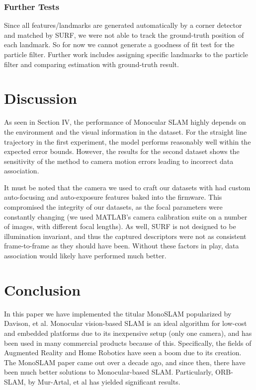 \documentclass[conference]{IEEEtran}
\begin{document}
\subsubsection{Further Tests}
Since all features/landmarks are generated automatically by a corner detector and matched by SURF, we were not able to track the ground-truth position of each landmark. So for now we cannot generate a goodness of fit test for the particle filter. Further work includes assigning specific landmarks to the particle filter and comparing estimation with ground-truth result.


\section{Discussion}
As seen in Section IV, the performance of Monocular SLAM highly depends on the environment and the visual information in the dataset. For the straight line trajectory in the first experiment, the model performs reasonably well within the expected error bounds. However, the results for the second dataset shows the sensitivity of the method to camera motion errors leading to incorrect data association. 

It must be noted that the camera we used to craft our datasets with had custom auto-focusing and auto-exposure features baked into the firmware. This compromised the integrity of our datasets, as the focal parameters were constantly changing (we used MATLAB's camera calibration suite on a number of images, with different focal lengths). As well, SURF is not designed to be illumination invariant, and thus the captured descriptors were not as consistent frame-to-frame as they should have been. Without these factors in play, data association would likely have performed much better.



\section{Conclusion}

In this paper we have implemented the titular MonoSLAM popularized by Davison, et al. Monocular vision-based SLAM is an ideal algorithm for low-cost and embedded platforms due to its inexpensive setup (only one camera), and has been used in many commercial products because of this. Specifically, the fields of Augmented Reality and Home Robotics have seen a boom due to its creation. The MonoSLAM paper came out over a decade ago, and since then, there have been much better solutions to Monocular-based SLAM. Particularly, ORB-SLAM, by Mur-Artal, et al \cite{mur2015orb} has yielded significant results.
\end{document}
